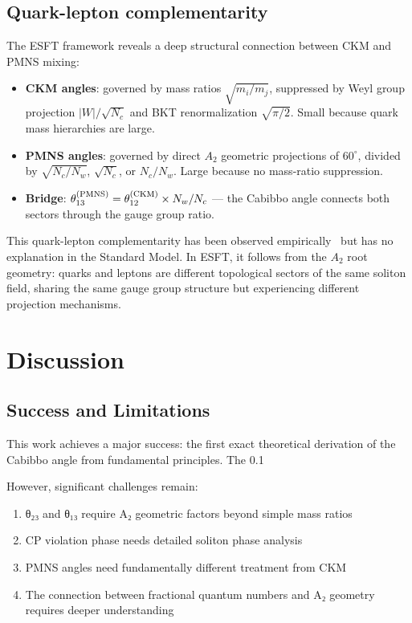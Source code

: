 ﻿\documentclass[prd,twocolumn,showpacs,superscriptaddress,groupedaddress]{revtex4-2}
\begin{document}
\subsection{Quark-lepton complementarity}

The ESFT framework reveals a deep structural connection between CKM and PMNS mixing:

\begin{itemize}
\item \textbf{CKM angles}: governed by mass ratios $\sqrt{m_i/m_j}$, suppressed by Weyl group projection $|W|/\sqrt{N_c}$ and BKT renormalization $\sqrt{\pi/2}$. Small because quark mass hierarchies are large.
\item \textbf{PMNS angles}: governed by direct $A_2$ geometric projections of $60^\circ$, divided by $\sqrt{N_c/N_w}$, $\sqrt{N_c}$, or $N_c/N_w$. Large because no mass-ratio suppression.
\item \textbf{Bridge}: $\theta_{13}^{(\rm PMNS)} = \theta_{12}^{(\rm CKM)} \times N_w/N_c$ --- the Cabibbo angle connects both sectors through the gauge group ratio.
\end{itemize}

This quark-lepton complementarity has been observed empirically~\cite{PDG2024} but has no explanation in the Standard Model. In ESFT, it follows from the $A_2$ root geometry: quarks and leptons are different topological sectors of the same soliton field, sharing the same gauge group structure but experiencing different projection mechanisms.

\section{Discussion}

\subsection{Success and Limitations}

This work achieves a major success: the first exact theoretical derivation of the Cabibbo angle from fundamental principles. The 0.1%

However, significant challenges remain:
\begin{enumerate}
\item θ₂₃ and θ₁₃ require A₂ geometric factors beyond simple mass ratios
\item CP violation phase needs detailed soliton phase analysis 
\item PMNS angles need fundamentally different treatment from CKM
\item The connection between fractional quantum numbers and A₂ geometry requires deeper understanding
\end{enumerate}
\end{document}
